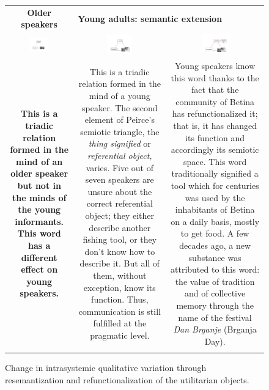 \documentclass[output=paper]{LSP/langsci}
\begin{document}
\begin{figure}
\begin{tabular}{ccc}
\lsptoprule
{\bfseries Older speakers} & \multicolumn{2}{l}{{\bfseries Young adults: semantic extension}}\\
\includegraphics[width=0.3\textwidth]{illustrations/skevin_fig41} &
\includegraphics[width=0.3\textwidth]{illustrations/skevin_fig42} &
\includegraphics[width=0.3\textwidth]{illustrations/skevin_fig43}\\
\begin{minipage}[t]{0.3\textwidth}{\bfseries This is a triadic relation formed in the mind of an older speaker but not in the minds of the young informants. This word has a different effect on young speakers.}\end{minipage} & 
\begin{minipage}[t]{0.3\textwidth}This is a triadic relation formed in the mind of a young speaker. The second element of Peirce's semiotic triangle, the \textit{thing signified} or \textit{referential object,} varies. Five out of seven speakers are unsure about the correct referential object; they either describe another fishing tool, or they don't know how to describe it. But all of them, without exception, know its function. Thus, communication is still fulfilled at the pragmatic level.\end{minipage} &
\begin{minipage}[t]{0.3\textwidth}Young speakers know this word thanks to the fact that the community of Betina has refunctionalized it; that is, it has changed its function and accordingly its semiotic space. This word traditionally signified a tool which for centuries was used by the inhabitants of Betina on a daily basis, mostly to get food. A few decades ago, a new substance was attributed to this word: the value of tradition and of collective memory through the name of the festival \textit{Dan Brganje }(Brganja Day).\end{minipage}\\
\lspbottomrule
\end{tabular}
\caption{Change in intrasystemic qualitative variation through resemantization and refunctionalization of the utilitarian objects.}
\label{fig:4}
\end{figure}
\end{document}
